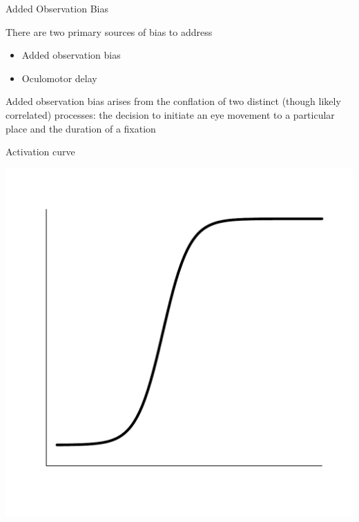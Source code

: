 \documentclass{beamer}
\newcommand{\vp}{\vspace{2mm}}
\providecommand{\cn}[1]{\textcolor{blue}{#1}}
\begin{document}
\begin{frame}{Added Observation Bias}\large

There are two primary sources of bias to address

\begin{itemize}
\item Added observation bias
\item Oculomotor delay
\end{itemize}

\vspace{6mm}

Added observation bias arises from the conflation of two distinct (though likely correlated) processes: the decision to initiate an eye movement to a particular place and the duration of a fixation 
%
%

\end{frame}


\begin{frame}{Activation curve}
\vspace{-5mm}
\begin{center}
\includegraphics[scale=0.4]{img/logistic_a.pdf}
\end{center}


\end{frame}
\end{document}
